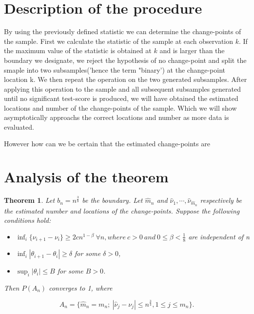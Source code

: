 \documentclass[a4paper, 12pt, notitlepage]{report}
\newtheorem{theorem}{Theorem}[chapter]
\begin{document}
\section{Description of the procedure}
%
By using the previously defined statistic we can determine the change-points of the sample. First we calculate the statistic of the sample at each observation $k$. If the maximum value of the statistic is obtained at $k$ and is larger than the boundary we designate, we reject the hypothesis of no change-point and split the smaple into two subsamples('hence the term "binary') at the change-point location k. We then repeat the operation on the two generated subsamples. After applying this operation to the sample and all subsequent subsamples generated until no significant test-score is produced, we will have obtained the estimated locations and number of the change-points of the sample. Which we will show asymptotically approachs the correct locations and number as more data is evaluated.  %

However how can we be certain that the estimated change-points are 

\section{Analysis of the theorem}
%
\begin{theorem}
 
Let \(b_n = n^{\frac{3}{8}}\) be the boundary. Let \( \hat m_n  \) and \( \hat \nu_1, \cdots, \hat \nu_{ \hat m_n} \) respectively be the estimated number and locations of the change-points. Suppose the following conditions hold:
\begin{itemize}

\item[(i)] \( \inf_i \{ \nu_{i+1} - \nu_i \} \geq 2cn^{1 - \beta} \ \forall n, where \ c >0 \ and \ 0 \leq \beta < \frac{1}{8} \) are independent of n

\item[(ii)] \(\inf_i |\theta_{i+1} - \theta_{i}| \geq \delta\) for some \(\delta > 0\),

\item[(iii)]\(\sup_i |\theta_i| \leq B\) for some \( B > 0\).

\end{itemize}

Then $P(A_n)$ converges to 1, where

\[ A_n = \{\hat m_n = m_n;\ | \hat \nu_j - \nu_j| \leq n^{\frac{3}{4}}, 1 \leq j \leq m_n \}.\]

\end{theorem}
\end{document}
